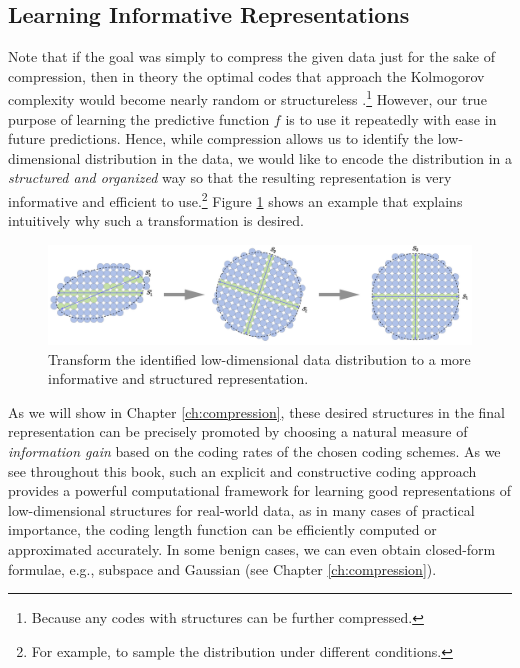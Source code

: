 \documentclass[../../book-main.tex]{subfiles}
\begin{document}
\subsection{Learning Informative Representations}
Note that if the goal was simply to compress the given data just for the sake of compression, then in theory the optimal codes that approach the Kolmogorov complexity would become nearly random or structureless \cite{Chaitin-1966}.\footnote{Because any codes with structures can be further compressed.} However, our true purpose of learning the predictive function $f$ is to use it repeatedly with ease in future predictions. Hence, while compression allows us to identify the low-dimensional distribution in the data, we would like to encode the distribution in a {\em structured and organized} way so that the resulting representation is very informative and efficient to use.\footnote{For example, to sample the distribution under different conditions.} Figure \ref{fig:expansion} shows an example that explains intuitively why such a transformation is desired. 

\begin{figure}
    \centering
    \includegraphics[width=0.98\linewidth]{figs_chap4/coding-transform.png}
    \caption{Transform the identified low-dimensional data distribution to a more informative and structured representation.}
    \label{fig:expansion}
\end{figure}
As we will show in Chapter \ref{ch:compression}, these desired structures in the final representation can be precisely promoted by choosing a natural measure of {\em information gain} based on the coding rates of the chosen coding schemes. As we see throughout this book, such an explicit and constructive coding approach provides a powerful computational framework for learning good representations of low-dimensional structures for real-world data, as in many cases of practical importance, the coding length function can be efficiently computed or approximated accurately. In some benign cases, we can even obtain closed-form formulae, e.g., subspace and Gaussian (see Chapter \ref{ch:compression}). 
\end{document}
